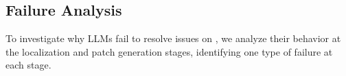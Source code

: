 

   

 

\subsection{Failure Analysis}

To investigate why LLMs fail to resolve issues on \Swebenchx, we analyze their behavior at the localization and patch generation stages, identifying one type of failure at each stage.

